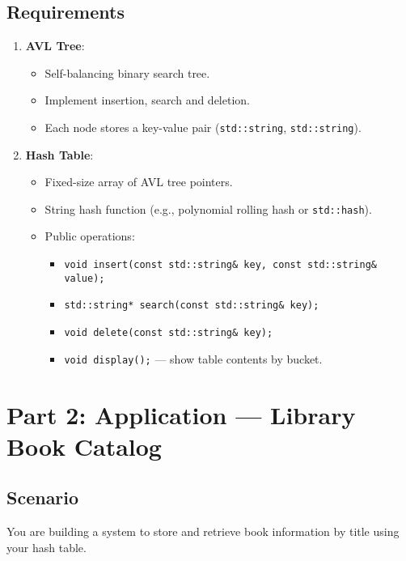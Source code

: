 \documentclass[11pt]{article}
\begin{document}
\subsection*{Requirements}
\begin{enumerate}
  \item \textbf{AVL Tree}:
    \begin{itemize}
      \item Self-balancing binary search tree.
      \item Implement insertion, search and deletion.
      \item Each node stores a key-value pair (\texttt{std::string}, \texttt{std::string}).
    \end{itemize}
  \item \textbf{Hash Table}:
    \begin{itemize}
      \item Fixed-size array of AVL tree pointers.
      \item String hash function (e.g., polynomial rolling hash or \texttt{std::hash}).
      \item Public operations:
        \begin{itemize}
          \item \texttt{void insert(const std::string\& key, const std::string\& value);}
          \item \texttt{std::string* search(const std::string\& key);}
          \item \texttt{void delete(const std::string\& key);}
          \item \texttt{void display();} — show table contents by bucket.
        \end{itemize}
    \end{itemize}
\end{enumerate}

\section*{Part 2: Application — Library Book Catalog}

\subsection*{Scenario}
You are building a system to store and retrieve book information by title using your hash table.
\end{document}
